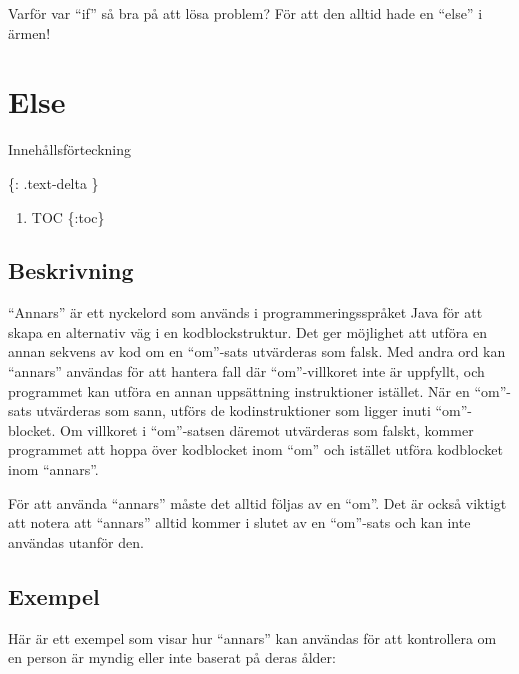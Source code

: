 Varför var ``if'' så bra på att lösa problem? För att den alltid hade en
``else'' i ärmen!

\hypertarget{else}{%
\section{Else}\label{else}}

Innehållsförteckning

\{: .text-delta \}

\begin{enumerate}
\def\labelenumi{\arabic{enumi}.}
\tightlist
\item
  TOC \{:toc\}
\end{enumerate}

\hypertarget{beskrivning}{%
\subsection{Beskrivning}\label{beskrivning}}

``Annars'' är ett nyckelord som används i programmeringsspråket Java för
att skapa en alternativ väg i en kodblockstruktur. Det ger möjlighet att
utföra en annan sekvens av kod om en ``om''-sats utvärderas som falsk.
Med andra ord kan ``annars'' användas för att hantera fall där
``om''-villkoret inte är uppfyllt, och programmet kan utföra en annan
uppsättning instruktioner istället. När en ``om''-sats utvärderas som
sann, utförs de kodinstruktioner som ligger inuti ``om''-blocket. Om
villkoret i ``om''-satsen däremot utvärderas som falskt, kommer
programmet att hoppa över kodblocket inom ``om'' och istället utföra
kodblocket inom ``annars''.

För att använda ``annars'' måste det alltid följas av en ``om''. Det är
också viktigt att notera att ``annars'' alltid kommer i slutet av en
``om''-sats och kan inte användas utanför den.

\hypertarget{exempel}{%
\subsection{Exempel}\label{exempel}}

Här är ett exempel som visar hur ``annars'' kan användas för att
kontrollera om en person är myndig eller inte baserat på deras ålder:

\hypertarget{cb1}{}
\begin{Shaded}
\begin{Highlighting}[]
\OperatorTok{=} \OperatorTok{;}
 \OperatorTok{(}\OperatorTok{\textgreater{}=} \OperatorTok{)} \OperatorTok{\{}
    \OperatorTok{(}\OperatorTok{);}
\OperatorTok{\}}  \OperatorTok{\{}
    \OperatorTok{(}\OperatorTok{);}
\OperatorTok{\}}
\end{Highlighting}
\end{Shaded}

